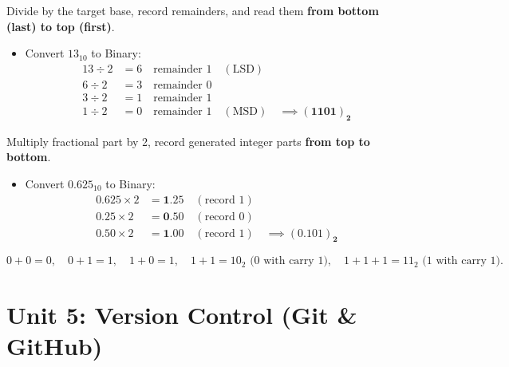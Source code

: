 \documentclass[a4paper,11pt]{article}
\begin{document}
\begin{handwbox}
Divide by the target base, record remainders, and read them \textbf{from bottom (last) to top (first)}.
\begin{itemize}[leftmargin=5mm]
    \item Convert $13_{10}$ to Binary:
    \begin{align*}
    13 \div 2 &= 6 \quad \text{remainder } 1 \quad (\text{LSD}) \\
    6 \div 2 &= 3 \quad \text{remainder } 0 \\
    3 \div 2 &= 1 \quad \text{remainder } 1 \\
    1 \div 2 &= 0 \quad \text{remainder } 1 \quad (\text{MSD}) \quad \implies \mathbf{(1101)_2}
    \end{align*}
\end{itemize}
\end{handwbox}

\begin{handwbox}
Multiply fractional part by 2, record generated integer parts \textbf{from top to bottom}.
\begin{itemize}[leftmargin=5mm]
    \item Convert $0.625_{10}$ to Binary:
    \begin{align*}
    0.625 \times 2 &= \mathbf{1}.25 \quad (\text{record } 1) \\
    0.25 \times 2  &= \mathbf{0}.50 \quad (\text{record } 0) \\
    0.50 \times 2  &= \mathbf{1}.00 \quad (\text{record } 1) \quad \implies \mathbf{(0.101)_2}
    \end{align*}
\end{itemize}
\end{handwbox}

\begin{examalert}
\[
0+0=0, \quad 0+1=1, \quad 1+0=1, \quad 1+1=10_2 \text{ (0 with carry 1)}, \quad 1+1+1=11_2 \text{ (1 with carry 1)}.
\]
\end{examalert}

\newpage

\section{Unit 5: Version Control (Git \& GitHub)}
\end{document}
